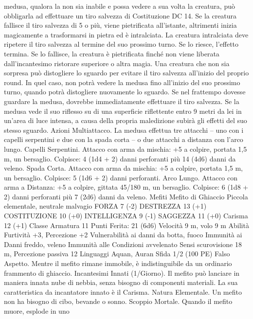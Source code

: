 \begin{multicols}{2}
medusa, qualora la non sia inabile e possa vedere a sua volta la
creatura, può obbligarla ad effettuare un tiro salvezza di
Costituzione DC 14. Se la creatura fallisce il tiro salvezza di 5 o
più, viene pietrificata all’istante, altrimenti inizia magicamente a
trasformarsi in pietra ed è intralciata. La creatura intralciata deve
ripetere il tiro salvezza al termine del suo prossimo turno. Se lo
riesce, l’effetto termina. Se lo fallisce, la creatura è pietrificata
finché non viene liberata dall’incantesimo ristorare superiore o
altra magia.
Una creatura che non sia sorpresa può distogliere lo sguardo per
evitare il tiro salvezza all’inizio del proprio round. In quel caso,
non potrà vedere la medusa fino all’inizio del suo prossimo
turno, quando potrà distogliere nuovamente lo sguardo. Se nel
frattempo dovesse guardare la medusa, dovrebbe
immediatamente effettuare il tiro salvezza.
Se la medusa vede il suo riflesso su di una superficie riflettente
entro 9 metri da lei in un’area di luce intensa, a causa della
propria maledizione subirà gli effetti del suo stesso sguardo.
Azioni
Multiattacco. La medusa effettua tre attacchi – uno con i capelli
serpentini e due con la spada corta – o due attacchi a distanza
con l’arco lungo.
Capelli Serpentini. Attacco con arma da mischia: +5 a colpire,
portata 1,5 m, un bersaglio.
Colpisce: 4 (1d4 + 2) danni perforanti più 14 (4d6) danni da
veleno.
Spada Corta. Attacco con arma da mischia: +5 a colpire, portata
1,5 m, un bersaglio.
Colpisce: 5 (1d6 + 2) danni perforanti.
Arco Lungo. Attacco con arma a Distanza: +5 a colpire, gittata
45/180 m, un bersaglio.
Colpisce: 6 (1d8 + 2) danni perforanti più 7 (2d6) danni da
veleno.
Mefiti
Mefito di Ghiaccio
Piccola elementale, neutrale malvagio
FORZA 7 (-2)
DESTREZZA 13 (+1)
COSTITUZIONE 10 (+0)
INTELLIGENZA 9 (-1)
SAGGEZZA 11 (+0)
Carisma 12 (+1)
Classe Armatura 11
\hspace*{0pt}\hfill{Punti Ferita}: 21 (6d6)
Velocità 9 m, volo 9 m
Abilità Furtività +3, Percezione +2
Vulnerabilità ai danni da botta, fuoco
Immunità ai Danni freddo, veleno
Immunità alle Condizioni avvelenato
Sensi scurovisione 18 m, Percezione passiva 12
Linguaggi Aquan, Auran
Sfida 1/2 (100 PE)
Falso Aspetto. Mentre il mefito rimane immobile, è
indistinguibile da un ordinario frammento di ghiaccio.
Incantesimi Innati (1/Giorno). Il mefito può lanciare in maniera
innata nube di nebbia, senza bisogno di componenti materiali. La
sua caratteristica da incantatore innato è il Carisma.
Natura Elementale. Un mefito non ha bisogno di cibo, bevande
o sonno.
Scoppio Mortale. Quando il mefito muore, esplode in uno

\end{multicols}
